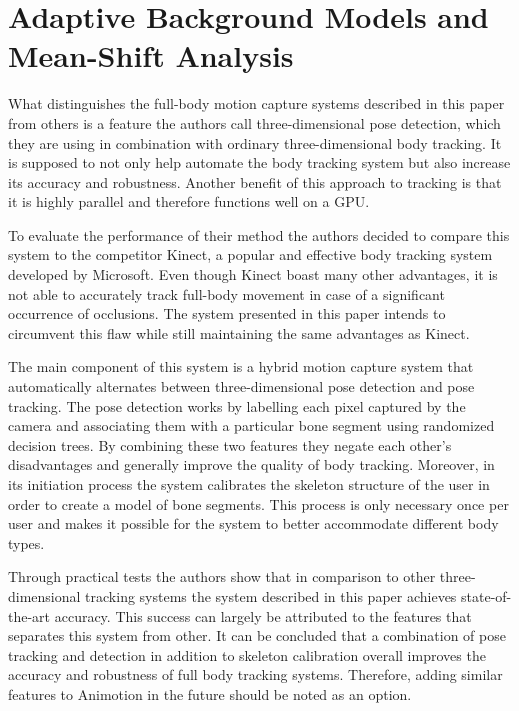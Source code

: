 \section{Adaptive Background Models and Mean-Shift Analysis}
What distinguishes the full-body motion capture systems described in this paper from others is a feature the authors call three-dimensional pose detection, which they are using
in combination with ordinary three-dimensional body tracking. It is supposed to not only help automate the body tracking system but also increase its accuracy and robustness.
Another benefit of this approach to tracking is that it is highly parallel and therefore functions well on a GPU. \cite{Adaptive-background-models}

To evaluate the performance of their method the authors decided to compare this system to the competitor Kinect, a popular and effective body tracking system developed by Microsoft.
Even though Kinect boast many other advantages, it is not able to accurately track full-body movement in case of a significant occurrence of occlusions. The system presented in
this paper intends to circumvent this flaw while still maintaining the same advantages as Kinect.

The main component of this system is a hybrid motion capture system that automatically alternates between three-dimensional pose detection and pose tracking. The pose detection
works by labelling each pixel captured by the camera and associating them with a particular bone segment using randomized decision trees. By combining these two features
they negate each other's disadvantages and generally improve the quality of body tracking. Moreover, in its initiation process the system calibrates the skeleton structure
of the user in order to create a model of bone segments. This process is only necessary once per user and makes it possible for the system to better accommodate different body
types.

Through practical tests the authors show that in comparison to other three-dimensional tracking systems the system described in this paper achieves state-of-the-art accuracy.
This success can largely be attributed to the features that separates this system from other. It can be concluded that a combination of pose tracking and detection in addition
to skeleton calibration overall improves the accuracy and robustness of full body tracking systems. Therefore, adding similar features to Animotion in the future should be
noted as an option.
